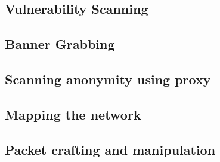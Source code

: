 \subsection{Vulnerability Scanning}

\subsection{Banner Grabbing}

\subsection{Scanning anonymity using proxy}

\subsection{Mapping the network}

\subsection{Packet crafting and manipulation}